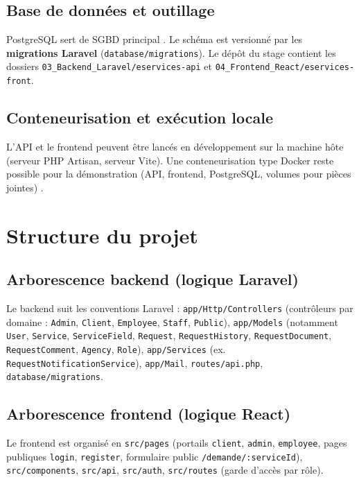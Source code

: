 \newpage
\subsection{Base de données et outillage}

PostgreSQL sert de SGBD principal \cite{postgresdoc}. Le schéma est versionné par les \textbf{migrations Laravel} (\texttt{database/migrations}). Le dépôt du stage contient les dossiers \texttt{03\_Backend\_Laravel/eservices-api} et \texttt{04\_Frontend\_React/eservices-front}.

\subsection{Conteneurisation et exécution locale}

L'API et le frontend peuvent être lancés en développement sur la machine hôte (serveur PHP Artisan, serveur Vite). Une conteneurisation type Docker reste possible pour la démonstration (API, frontend, PostgreSQL, volumes pour pièces jointes) \cite{dockerdoc,twelvefactor}.

\section{Structure du projet}

\subsection{Arborescence backend (logique Laravel)}

Le backend suit les conventions Laravel : \texttt{app/Http/Controllers} (contrôleurs par domaine : \texttt{Admin}, \texttt{Client}, \texttt{Employee}, \texttt{Staff}, \texttt{Public}), \texttt{app/Models} (notamment \texttt{User}, \texttt{Service}, \texttt{ServiceField}, \texttt{Request}, \texttt{RequestHistory}, \texttt{RequestDocument}, \texttt{RequestComment}, \texttt{Agency}, \texttt{Role}), \texttt{app/Services} (ex. \texttt{RequestNotificationService}), \texttt{app/Mail}, \texttt{routes/api.php}, \texttt{database/migrations}.

\subsection{Arborescence frontend (logique React)}

Le frontend est organisé en \texttt{src/pages} (portails \texttt{client}, \texttt{admin}, \texttt{employee}, pages publiques \texttt{login}, \texttt{register}, formulaire public \texttt{/demande/:serviceId}), \texttt{src/components}, \texttt{src/api}, \texttt{src/auth}, \texttt{src/routes} (garde d'accès par rôle).

